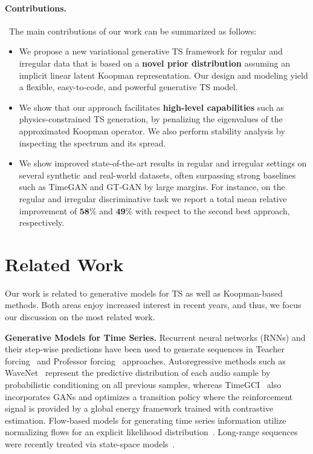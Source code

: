 \documentclass{article} %
\begin{document}
\vspace{-2mm}
\paragraph{Contributions.} \ The main contributions of our work can be summarized as follows: \vspace{-2mm}
\begin{itemize}[leftmargin=*]
    \item 
    We propose a new variational generative TS framework for regular and irregular data that is based on a \textbf{novel prior distribution} assuming an implicit linear latent Koopman representation.
    Our design and modeling yield a flexible, easy-to-code, and powerful generative TS model. 

    \item 
    We show that our approach facilitates \textbf{high-level capabilities} such as physics-constrained TS generation, by penalizing the eigenvalues of the approximated Koopman operator. We also perform stability analysis by inspecting the spectrum and its spread.
    
    \item 
    We show improved state-of-the-art results in regular and irregular settings on several synthetic and real-world datasets, often surpassing strong baselines such as TimeGAN and GT-GAN by large margins. 
    For instance, on the regular and irregular discriminative task we report a total mean relative improvement of $\textbf{58\%}$ and $\textbf{49\%}$ with respect to the second best approach, respectively.
\end{itemize}


\section{Related Work}

Our work is related to generative models for TS as well as Koopman-based methods. Both areas enjoy increased interest in recent years, and thus, we focus our discussion on the most related work.

\textbf{Generative Models for Time Series.} 
Recurrent neural networks (RNNs) and their step-wise predictions have been used to generate sequences in Teacher forcing~\citep{graves2013generating} and Professor forcing~\citep{goyal2016professor} approaches. 
Autoregressive methods such as WaveNet~\citep{oord2016wavenet} represent the predictive distribution of each audio sample by probabilistic conditioning on all previous samples, whereas TimeGCI~\citep{jarrett2021time} also incorporates GANs and optimizes a transition policy where the reinforcement signal is provided by a global energy framework trained with contrastive estimation. 
Flow-based models for generating time series information utilize normalizing flows for an explicit likelihood distribution~\citep{alaa2020generative}. Long-range sequences were recently treated via state-space models~\citep{zhou2023deep}. 
\end{document}
